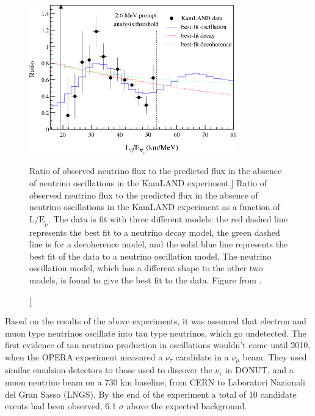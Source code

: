 \begin{figure}

	\centering

	\includegraphics[width=0.8\textwidth]{figures/kamland_spec.png}

	\caption
	[Ratio of observed neutrino flux to the predicted flux in the absence of
	neutrino oscillations in the KamLAND experiment.]
	{Ratio of observed neutrino flux to the predicted flux in the absence of
	neutrino oscillations in the KamLAND experiment as a function of 
	\(\mbox{L/E}_\nu\). The data is fit with three different models: the red 
	dashed line represents the best fit to a neutrino decay model, the green 
	dashed line is for a decoherence model, and the solid blue line represents the 
	best fit of the data to a neutrino oscillation model. The neutrino oscillation
	model, which has a different shape to the other two models, is found to give 
	the best fit to the data. Figure from \cite{Araki2005}.} 

	\label{fig:kamland_spectrum}

\end{figure}

Based on the results of the above experiments, it was assumed that electron and
muon type neutrinos oscillate into tau type neutrinos, which go undetected. 
The first evidence of tau neutrino production in oscillations wouldn't come 
until 2010, when the OPERA experiment measured a \(\nu_\tau\) candidate in a 
\(\nu_\mu\) beam. They used similar emulsion detectors to those used to 
discover the \(\nu_\tau\) in DONUT, and a muon neutrino beam on a 730 km 
baseline, from CERN to Laboratori Nazionali del Gran Sasso (LNGS). By the end 
of the experiment a total of 10 candidate events had been observed, 6.1 
\(\sigma\) above the expected background\cite{Agafonova2010, Agafonova2018}.

